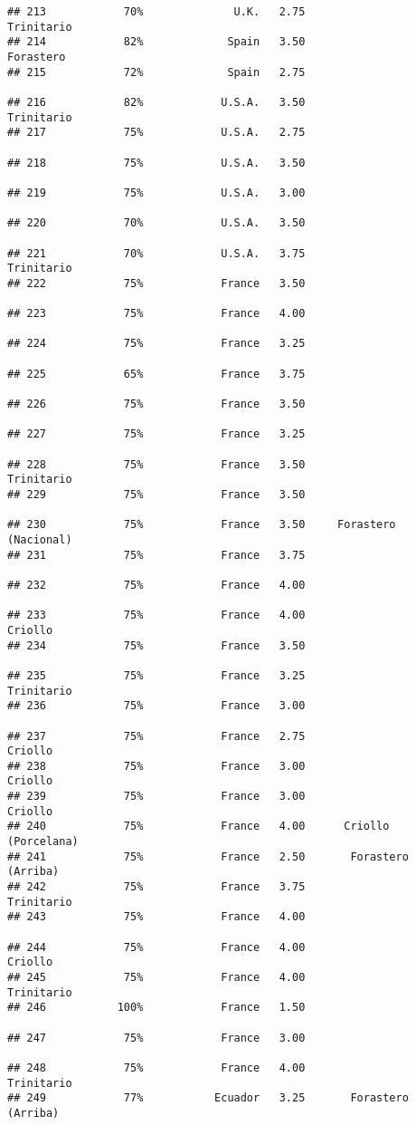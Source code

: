 \documentclass[
]{article}
\begin{document}
\begin{verbatim}
## 213            70%              U.K.   2.75               Trinitario
## 214            82%             Spain   3.50                Forastero
## 215            72%             Spain   2.75                         
## 216            82%            U.S.A.   3.50               Trinitario
## 217            75%            U.S.A.   2.75                         
## 218            75%            U.S.A.   3.50                         
## 219            75%            U.S.A.   3.00                         
## 220            70%            U.S.A.   3.50                         
## 221            70%            U.S.A.   3.75               Trinitario
## 222            75%            France   3.50                         
## 223            75%            France   4.00                         
## 224            75%            France   3.25                         
## 225            65%            France   3.75                         
## 226            75%            France   3.50                         
## 227            75%            France   3.25                         
## 228            75%            France   3.50               Trinitario
## 229            75%            France   3.50                         
## 230            75%            France   3.50     Forastero (Nacional)
## 231            75%            France   3.75                         
## 232            75%            France   4.00                         
## 233            75%            France   4.00                  Criollo
## 234            75%            France   3.50                         
## 235            75%            France   3.25               Trinitario
## 236            75%            France   3.00                         
## 237            75%            France   2.75                  Criollo
## 238            75%            France   3.00                  Criollo
## 239            75%            France   3.00                  Criollo
## 240            75%            France   4.00      Criollo (Porcelana)
## 241            75%            France   2.50       Forastero (Arriba)
## 242            75%            France   3.75               Trinitario
## 243            75%            France   4.00                         
## 244            75%            France   4.00                  Criollo
## 245            75%            France   4.00               Trinitario
## 246           100%            France   1.50                         
## 247            75%            France   3.00                         
## 248            75%            France   4.00               Trinitario
## 249            77%           Ecuador   3.25       Forastero (Arriba)

\end{verbatim}
\end{document}
